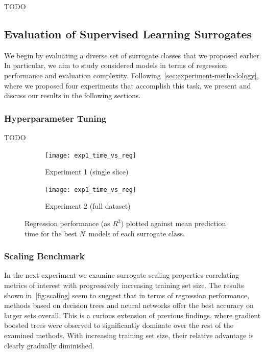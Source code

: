 TODO

\subsection{Evaluation of Supervised Learning Surrogates}
\label{sec:modelres}

We begin by evaluating a diverse set of surrogate classes that we proposed
earlier. In particular, we aim to study considered models in terms of regression
performance and evaluation complexity.
Following~\cref{sec:experiment-methodology}, where we proposed four experiments
that accomplish this task, we present and discuss our results in the following
sections.


\subsubsection{Hyperparameter Tuning}

TODO

\begin{figure}[h]
	\centering
	\begin{subfigure}[b]{0.5\textwidth}
		\centering
		\texttt{[image: exp1\_time\_vs\_reg]}
		\caption{Experiment 1 (single slice)}
	\end{subfigure}\hfill%
	\begin{subfigure}[b]{0.5\textwidth}
		\centering
		\texttt{[image: exp1\_time\_vs\_reg]}
		\caption{Experiment 2 (full dataset)}
	\end{subfigure}
	\caption{Regression performance (as $R^2$) plotted against mean
	prediction time for the best $N$~models of each surrogate class.} %
	\label{fig:time-vs-reg}
\end{figure}


\subsubsection{Scaling Benchmark}

In the next experiment we examine surrogate scaling properties correlating
metrics of interest with progressively increasing training set size. The results
shown in~\cref{fig:scaling} seem to suggest that in terms of regression performance,
methods based on decision trees and neural networks offer the best accuracy on
larger sets overall. This is a curious extension of previous findings, where
gradient boosted trees were observed to significantly dominate over the rest of
the examined methods. With increasing training set size, their relative advantage is
clearly gradually diminished.

